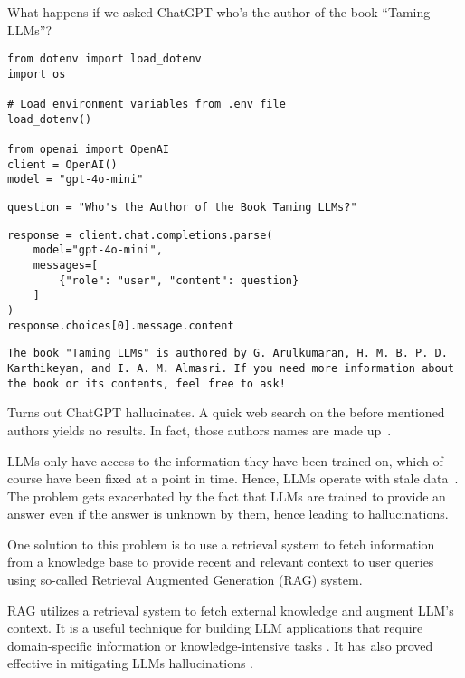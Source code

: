 What happens if we asked ChatGPT who's the author of the book ``Taming LLMs''?

\begin{verbatim}
from dotenv import load_dotenv
import os

# Load environment variables from .env file
load_dotenv()

from openai import OpenAI
client = OpenAI()
model = "gpt-4o-mini"
\end{verbatim}

\begin{verbatim}
question = "Who's the Author of the Book Taming LLMs?"
\end{verbatim}

\begin{verbatim}
response = client.chat.completions.parse(
    model="gpt-4o-mini",
    messages=[
        {"role": "user", "content": question}
    ]
)
response.choices[0].message.content
\end{verbatim}
\begin{verbatim}
The book "Taming LLMs" is authored by G. Arulkumaran, H. M. B. P. D. Karthikeyan, and I. A. M. Almasri. If you need more information about the book or its contents, feel free to ask!
\end{verbatim}


Turns out ChatGPT hallucinates. A quick web search on the before mentioned authors yields no results. In fact, those authors names are made up~. 

LLMs only have access to the information they have been trained on, which of course have been fixed at a point in time. Hence, LLMs operate with stale data~. The problem gets exacerbated by the fact that LLMs are trained to provide an answer even if the answer is unknown by them, hence leading to hallucinations. 

One solution to this problem is to use a retrieval system to fetch information from a knowledge base to provide recent and relevant context to user queries using so-called Retrieval Augmented Generation (RAG) system.

RAG utilizes a retrieval system to fetch external knowledge and augment LLM's context. It is a useful technique for building LLM applications that require domain-specific information or knowledge-intensive tasks . It has also proved effective in mitigating LLMs hallucinations .

